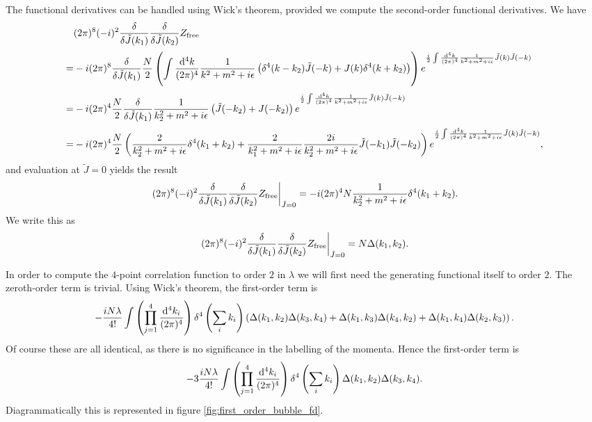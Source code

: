 The functional derivatives can be handled using Wick's theorem, provided we compute the second-order functional derivatives. We have
\begin{align*}
&(2\pi)^{8}(-i)^{2}\fdv{\tilde{J}(k_{1})}\fdv{\tilde{J}(k_{2})}Z_{\text{free}} \\
=& -i(2\pi)^{8}\fdv{\tilde{J}(k_{1})}\frac{N}{2}\left(\inte{}{}\frac{\dd[4]{k}}{(2\pi)^{4}}\frac{1}{k^{2} + m^{2} + i\epsilon}\left(\delta^{4}(k - k_{2})\tilde{J}(-k) + J(k)\delta^{4}(k + k_{2})\right)\right)e^{\frac{i}{2}\inte{}{}\frac{\dd[4]{k}}{(2\pi)^{4}}\frac{1}{k^{2} + m^{2} + i\epsilon}\tilde{J}(k)\tilde{J}(-k)} \\
=& -i(2\pi)^{4}\frac{N}{2}\fdv{\tilde{J}(k_{1})}\frac{1}{k_{2}^{2} + m^{2} + i\epsilon}\left(\tilde{J}(-k_{2}) + J(-k_{2})\right)e^{\frac{i}{2}\inte{}{}\frac{\dd[4]{k}}{(2\pi)^{4}}\frac{1}{k^{2} + m^{2} + i\epsilon}\tilde{J}(k)\tilde{J}(-k)} \\
=& -i(2\pi)^{4}\frac{N}{2}\left(\frac{2}{k_{2}^{2} + m^{2} + i\epsilon}\delta^{4}(k_{1} + k_{2}) + \frac{2}{k_{1}^{2} + m^{2} + i\epsilon}\frac{2i}{k_{2}^{2} + m^{2} + i\epsilon}\tilde{J}(-k_{1})\tilde{J}(-k_{2})\right)e^{\frac{i}{2}\inte{}{}\frac{\dd[4]{k}}{(2\pi)^{4}}\frac{1}{k^{2} + m^{2} + i\epsilon}\tilde{J}(k)\tilde{J}(-k)},
\end{align*}
and evaluation at $\tilde{J} = 0$ yields the result
\begin{align*}
\eval{(2\pi)^{8}(-i)^{2}\fdv{\tilde{J}(k_{1})}\fdv{\tilde{J}(k_{2})}Z_{\text{free}}}_{\tilde{J} = 0} = -i(2\pi)^{4}N\frac{1}{k_{2}^{2} + m^{2} + i\epsilon}\delta^{4}(k_{1} + k_{2}).
\end{align*}
We write this as
\begin{align*}
\eval{(2\pi)^{8}(-i)^{2}\fdv{\tilde{J}(k_{1})}\fdv{\tilde{J}(k_{2})}Z_{\text{free}}}_{\tilde{J} = 0} = N\Delta(k_{1}, k_{2}).
\end{align*}

In order to compute the $4$-point correlation function to order $2$ in $\lambda$ we will first need the generating functional itself to order $2$. The zeroth-order term is trivial. Using Wick's theorem, the first-order term is
\begin{align*}
-\frac{iN\lambda}{4!}\int\limits_{}^{}\left(\prod\limits_{j = 1}^{4}\frac{\dd[4]{k_{i}}}{(2\pi)^{4}}\right)\delta^{4}\left(\sum\limits_{i}k_{i}\right)\left(\Delta(k_{1}, k_{2})\Delta(k_{3}, k_{4}) + \Delta(k_{1}, k_{3})\Delta(k_{4}, k_{2}) + \Delta(k_{1}, k_{4})\Delta(k_{2}, k_{3})\right).
\end{align*}
Of course these are all identical, as there is no significance in the labelling of the momenta. Hence the first-order term is
\begin{align*}
-3\frac{iN\lambda}{4!}\int\limits_{}^{}\left(\prod\limits_{j = 1}^{4}\frac{\dd[4]{k_{i}}}{(2\pi)^{4}}\right)\delta^{4}\left(\sum\limits_{i}k_{i}\right)\Delta(k_{1}, k_{2})\Delta(k_{3}, k_{4}).
\end{align*}
Diagrammatically this is represented in figure \ref{fig:first_order_bubble_fd}.

